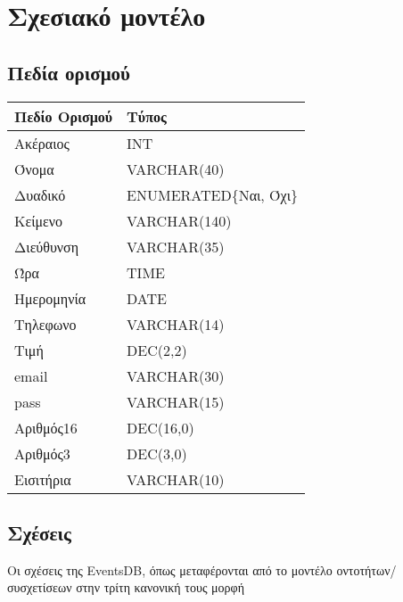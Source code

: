 ﻿
\section{Σχεσιακό μοντέλο}

\subsection{Πεδία ορισμού}


\begin{tabular}{|p{6cm}|p{8cm}|}
\hline
  Πεδίο Ορισμού & Τύπος                  \\ \hline
  Ακέραιος      & INT                    \\ \hline
  Όνομα         & VARCHAR(40)            \\ \hline
  Δυαδικό       & ENUMERATED\{Ναι, Όχι\} \\ \hline
  Κείμενο       & VARCHAR(140)           \\ \hline
  Διεύθυνση     & VARCHAR(35)            \\ \hline
  Ώρα           & TIME                   \\ \hline
  Ημερομηνία    & DATE                   \\ \hline
  Τηλεφωνο      & VARCHAR(14)            \\ \hline
  Τιμή          & DEC(2,2)               \\ \hline
  email         & VARCHAR(30)            \\ \hline
  pass          & VARCHAR(15)            \\ \hline
  Αριθμός16     & DEC(16,0)              \\ \hline
  Αριθμός3      & DEC(3,0)               \\ \hline
  Εισιτήρια     & VARCHAR(10)            \\ \hline
\end{tabular}

\subsection{Σχέσεις}

Οι σχέσεις της EventsDB, όπως μεταφέρονται από το μοντέλο οντοτήτων/
συσχετίσεων στην τρίτη κανονική τους μορφή

